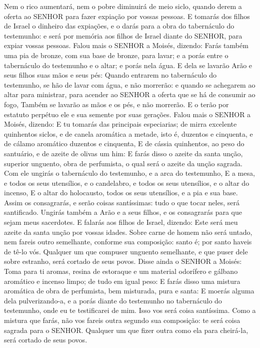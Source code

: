 {Nem o rico aumentará, nem o pobre diminuirá de meio siclo, quando derem a oferta ao SENHOR para fazer expiação por vossas pessoas.
E tomarás dos filhos de Israel o dinheiro das expiações, e o darás para a obra do tabernáculo do testemunho: e será por memória aos filhos de Israel diante do SENHOR, para expiar vossas pessoas.
Falou mais o SENHOR a Moisés, dizendo:
Farás também uma pia de bronze, com sua base de bronze, para lavar; e a porás entre o tabernáculo do testemunho e o altar; e porás nela água.
E dela se lavarão Arão e seus filhos suas mãos e seus pés:
Quando entrarem no tabernáculo do testemunho, se hão de lavar com água, e não morrerão: e quando se achegarem ao altar para ministrar, para acender ao SENHOR a oferta que se há de consumir ao fogo,
Também se lavarão as mãos e os pés, e não morrerão. E o terão por estatuto perpétuo ele e sua semente por suas gerações.
Falou mais o SENHOR a Moisés, dizendo:
E tu tomarás das principais especiarias; de mirra excelente quinhentos siclos, e de canela aromática a metade, isto é, duzentos e cinquenta, e de cálamo aromático duzentos e cinquenta,
E de cássia quinhentos, ao peso do santuário, e de azeite de olivas um him:
E farás disso o azeite da santa unção, superior unguento, obra de perfumista, o qual será o azeite da unção sagrada.
Com ele ungirás o tabernáculo do testemunho, e a arca do testemunho,
E a mesa, e todos os seus utensílios, e o candelabro, e todos os seus utensílios, e o altar do incenso,
E o altar do holocausto, todos os seus utensílios, e a pia e sua base.
Assim os consagrarás, e serão coisas santíssimas: tudo o que tocar neles, será santificado.
Ungirás também a Arão e a seus filhos, e os consagrarás para que sejam meus sacerdotes.
E falarás aos filhos de Israel, dizendo: Este será meu azeite da santa unção por vossas idades.
Sobre carne de homem não será untado, nem fareis outro semelhante, conforme sua composição: santo é; por santo haveis de tê-lo vós.
Qualquer um que compuser unguento semelhante, e que puser dele sobre estranho, será cortado de seus povos.
Disse ainda o SENHOR a Moisés: Toma para ti aromas, resina de estoraque e um material odorífero e gálbano aromático e incenso limpo; de tudo em igual peso:
E farás disso uma mistura aromática de obra de perfumista, bem misturada, pura e santa:
E moerás alguma dela pulverizando-a, e a porás diante do testemunho no tabernáculo do testemunho, onde eu te testificarei de mim. Isso vos será coisa santíssima.
Como a mistura que farás, não vos fareis outra segundo sua composição: te será coisa sagrada para o SENHOR.
Qualquer um que fizer outra como ela para cheirá-la, será cortado de seus povos.

}
